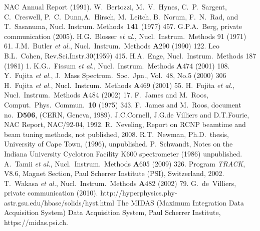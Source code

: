 \documentclass[11pt]{report}
\begin{document}
\begin{thebibliography}{abc99x}

 NAC Annual Report (1991).
 W.~Bertozzi, M.~V.~Hynes, C.~P.~Sargent, C.~Creswell, P.~C.~Dunn,A.~Hirsch, M.~Leitch, B.~Norum, F.~N.~Rad, and T.~Sasanuma, Nucl. Instrum. Methods~{\bf 141} (1977) 457.
 G.P.A.~Berg, private communication (2005).
   H.G.~Blosser {\it et al.}, Nucl.~Instrum.~Methods 91 (1971) 61.
   J.M.~Butler {\it et al.}, Nucl.~Instrum.~Methods {\bf A}290 (1990) 122.
   Leo
   B.L.~Cohen, Rev.Sci.Instr.30(1959) 415.
   H.A.~Enge, Nucl.~Instrum.~Methods  187 (1981) 1.
   K.G..~Fissum {\it et al.}, Nucl.~Instrum.~Methods {\bf A}474 (2001) 108.
   Y.~Fujita {\it et al.}, J.~Mass Spectrom.~Soc.~Jpn., Vol.~48, No.5 (2000) 306
   H.~Fujita {\it et al.}, Nucl.~Instrum.~Methods {\bf A}469 (2001) 55.
   H.~Fujita {\it et al.}, Nucl.~Instrum.~Methods {\bf A}484 (2002) 17.
   F.~James and M.~Roos, Comput.~Phys.~Commun.~{\bf 10} (1975) 343.
   F.~James and M.~Roos, document no.~{\bf D506}, (CERN, Geneva, 1989).
   J.C.Cornell, J.G.de Villiers and D.T.Fourie, NAC Report, NAC/92-04, 1992. 
   R.~Neveling, Report on RCNP beamtime and beam tuning methods, not published, 2008.
   R.T.~Newman, Ph.D.~thesis, University of Cape Town, (1996), unpublished.
   P.~Schwandt, Notes on the Indiana University Cyclotron Facility K600 spectrometer (1986) unpublished.
   A.~Tamii {\it et al.}, Nucl.~Instrum.~Methods {\bf A}605 (2009) 326.
   Program {\it TRACK}, V8.6, Magnet Section, Paul Scherrer Institute (PSI), Switzerland, 2002.
   T.~Wakasa {\it et al.}, Nucl.~Instrum.~Methods {\bf A}482 (2002) 79.
   G.~de~Villiers, private communication (2010).
   http://hyperphysics.phy-astr.gsu.edu/hbase/solids/hyst.html
   The MIDAS (Maximum Integration Data Acquisition System) Data Acquisition System, Paul Scherrer Institute, https://midas.psi.ch.
\end{thebibliography}
\end{document}
